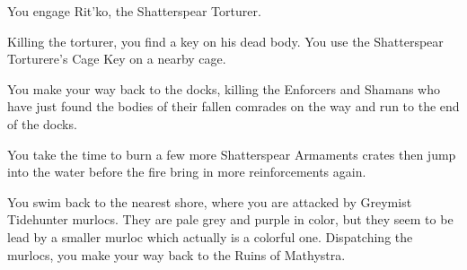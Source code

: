 


You engage Rit'ko, the Shatterspear Torturer.


Killing the torturer, you find a key on his dead body. You use the Shatterspear Torturere's Cage Key on a nearby cage.


You make your way back to the docks, killing the Enforcers and Shamans who have just found the bodies of their fallen comrades on the way and run to the end of the docks.


You take the time to burn a few more Shatterspear Armaments crates then jump into the water before the fire bring in more reinforcements again.

You swim back to the nearest shore, where you are attacked by Greymist Tidehunter murlocs. They are pale grey and purple in color, but they seem to be lead by a smaller murloc which actually is a colorful one. Dispatching the murlocs, you make your way back to the Ruins of Mathystra.
